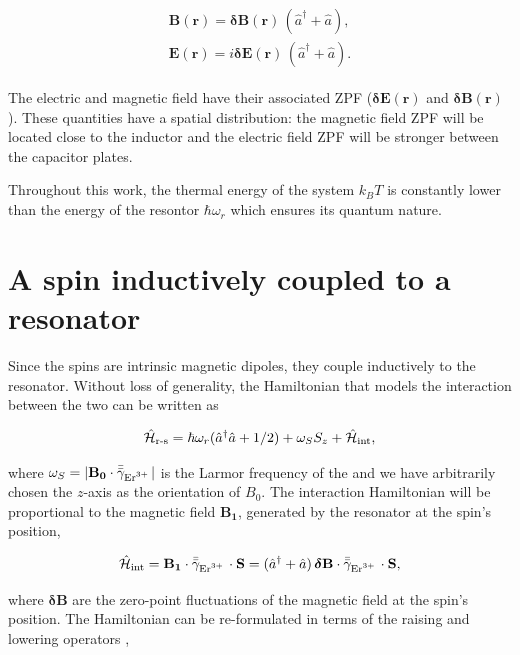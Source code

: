 \begin{align}
\begin{split}
    \mathbf{B}(\mathbf{r}) =   \boldsymbol{\delta}\mathbf{B}(\mathbf{r}) \, (\hat{a}^\dagger + \hat{a}), \\
    \mathbf{E}(\mathbf{r}) = i \boldsymbol{\delta}\mathbf{E}(\mathbf{r}) \, (\hat{a}^\dagger + \hat{a}). 
\end{split}
\end{align}

The electric and magnetic field have their associated ZPF ($\boldsymbol{\delta}\mathbf{E}(\mathbf{r})$ and $\boldsymbol{\delta}\mathbf{B}(\mathbf{r})$). These quantities have a spatial distribution: the magnetic field ZPF will be located close to the inductor and the electric field ZPF will be stronger between the capacitor plates.


Throughout this work, the thermal energy of the system $k_B T$ is constantly lower than the energy of the resontor $\hbar \omega_r$ which ensures its quantum nature. 

\section{A spin inductively coupled to a resonator}


Since the \Er spins are intrinsic magnetic dipoles, they couple inductively to the resonator. Without loss of generality, the Hamiltonian that models the interaction between the two can be written as 

\begin{align}
    \hat{\mathcal{H}}_{\text{r-s}} = \hbar\omega_r(\hat{a}^\dagger \hat{a} + 1/2) +  \omega_S S_z + \hat{\mathcal{H}}_{\text{int}},
\end{align}

\noindent where $\omega_S = | \mathbf{B_0} \cdot \bar{\bar{\gamma}}_{\text{Er$^{3+}$\,}} | $ is the Larmor frequency of the \Er and we have arbitrarily chosen the $z$-axis as the orientation of $B_0$. The interaction Hamiltonian will be proportional to the magnetic field $\mathbf{B_1}$, generated by the resonator at the spin's position,

\begin{equation}
    \hat{\mathcal{H}}_{\text{int}} = \mathbf{B_1} \cdot \bar{\bar{\gamma}}_{\text{Er$^{3+}$\,}} \cdot \mathbf{S} = (\hat{a}^\dagger + \hat{a}) \, \boldsymbol{\delta}\mathbf{B} \cdot \bar{\bar{\gamma}}_{\text{Er$^{3+}$\,}} \cdot \mathbf{S},
\end{equation}

\noindent where $\boldsymbol{\delta}\mathbf{B}$ are the zero-point fluctuations of the magnetic field at the \Er spin's position. The Hamiltonian can be re-formulated in terms of the raising and lowering operators ,

